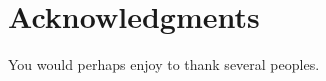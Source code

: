 \chapter*{Acknowledgments}

You would perhaps enjoy to thank several peoples.

\newpage












